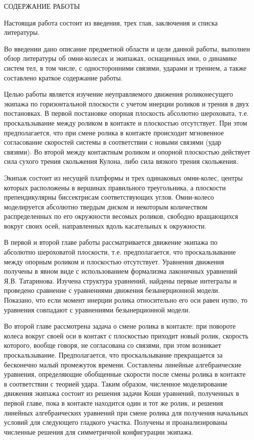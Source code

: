 СОДЕРЖАНИЕ РАБОТЫ

Настоящая работа состоит из введения, трех глав, заключения и списка литературы.

Во введении дано описание предметной области и цели данной работы, выполнен обзор литературы об омни-колесах и экипажах, оснащенных ими, о динамике систем тел, в том числе, с односторонними связями, ударами и трением, а также составлено краткое содержание работы.

Целью работы является изучение неуправляемого движения роликонесущего экипажа по горизонтальной плоскости с учетом инерции роликов и трения в двух постановках. В первой постановке опорная плоскость абсолютно шероховата, т.е. проскальзывание между роликом в контакте и плоскостью отсутствует. При этом предполагается, что при смене ролика в контакте происходит мгновенное согласование скоростей системы в соответствии с новыми связями (удар связями). Во второй между контактным роликом и опорной плоскостью действует сила сухого трения скольжения Кулона, либо сила вязкого трения скольжения. 

Экипаж состоит из несущей платформы и трех одинаковых омни-колес, центры которых расположены в вершинах правильного треугольника, а плоскости препендикулярны биссектрисам соответствующих углов. Омни-колесо моделируется абсолютно твердым диском и некоторым количеством распределенных по его окружности весомых роликов, свободно вращающихся вокруг своих осей, направленных вдоль касательных к окружности.

В первой и второй главе работы рассматривается движение  экипажа по абсолютно  шероховатой плоскости, т.е. предполагается, что проскальзывание между опорным роликом и плоскостью отсутствует. Уравнения движения получены в явном виде с использованием формализма лаконичных уравнений Я.В. Татаринова. Изучена структура уравнений, найдены первые интегралы и проведено сравнение с уравнениями движения безынерционной модели. Показано, что если момент инерции ролика относительно его оси равен нулю, то уравнения совпадают с уравнениями безынерционной модели.

Во второй главе рассмотрена задача о смене ролика в контакте: при повороте колеса вокруг своей оси в контакт с плоскостью приходит новый ролик, скорость которого, вообще говоря, не согласована со связями, при этом возникает проскальзывание. Предполагается, что проскальзывание прекращается за бесконечно малый промежуток времени. Составлены линейные алгебраические уравнения, определяющие обобщенные скорости после смены ролика в контакте в соответствии с теорией удара. Таким образом, численное моделирование движения экипажа состоит из решения задачи Коши уравнений, полученных в первой главе, пока в контакте находится один и тот же ролик, и решения линейных алгебраических уравнений при смене ролика для получения начальных условий для следующего гладкого участка. Получены и проанализированы численные решения для симметричной конфигурации экипажа.

